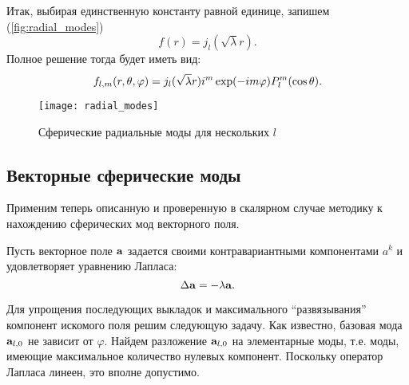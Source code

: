 \documentclass[12pt,a4paper]{article}
\begin{document}
            Итак, выбирая единственную константу равной единице, запишем (\autoref{fig:radial_modes})
            \begin{equation}
                f(r) = j_l(\sqrt{\lambda} r) .
            \end{equation}
            Полное решение тогда будет иметь вид:
            \begin{equation}
                f_{l,m}(r,\theta,\varphi)
                    = j_l(\sqrt{\lambda} r) i^m \exp(- i m \varphi) P^m_l\qty(\cos\theta) .
            \end{equation}
            \begin{figure}[h]
                \centering
                \texttt{[image: radial\_modes]}
                \caption[]{Сферические радиальные моды для нескольких $l$}
                \label{fig:radial_modes}
            \end{figure}


        \subsection{Векторные сферические моды}

            Применим теперь описанную и проверенную в скалярном случае методику к нахождению сферических мод векторного поля.

            Пусть векторное поле $\vb{a}$ задается своими контравариантными компонентами $a^k$ и удовлетворяет уравнению Лапласа:
            \begin{equation}\label{eq:laplacian_sturm_liouville}
                \Delta \vb{a} = - \lambda \vb{a} .
            \end{equation}

            Для упрощения последующих выкладок и максимального \enquote{развязывания} компонент искомого поля решим следующую задачу. Как известно, базовая мода $\vb{a}_{l,0}$ не зависит от $\varphi$. Найдем разложение $\vb{a}_{l,0}$ на элементарные моды, т.е. моды, имеющие максимальное количество нулевых компонент. Поскольку оператор Лапласа линеен, это вполне допустимо.
\end{document}
